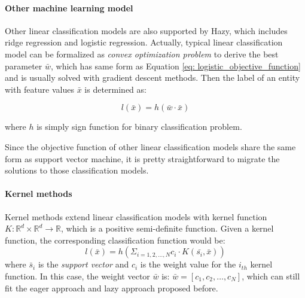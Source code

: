 \paragraph{Other machine learning model}
Other linear classification models are also supported by Hazy, which includes ridge regression and logistic regression. Actually, typical linear classification model can be formalized as {\em convex optimization problem} to derive the best parameter $\bar{w}$, which has same form as Equation \ref{eq: logistic_objective_function} and is usually solved with gradient descent methods. Then the label of an entity with feature values $\bar{x}$ is determined as:

\begin{equation}
    l(\bar{x}) = h(\bar{w}\cdot\bar{x})
\end{equation}


where $h$ is simply sign function for binary classification problem.

Since the objective function of other linear classification models share the same form as support vector machine, it is pretty straightforward to migrate the solutions to those classification models.

\paragraph{Kernel methods}
Kernel methods extend linear classification models with kernel function $K: \mathbb{R}^d \times \mathbb{R}^d \rightarrow \mathbb{R}$, which is a positive semi-definite function. Given a kernel function, the corresponding classification function would be:
\begin{equation}\label{eq: kernel classification}
    l(\bar{x})=h(\Sigma_{i=1,2,\dots,N}c_i\cdot K(\bar{s_i}, \bar{x}))
\end{equation}
where $\bar{s}_i$ is the {\em support vector} and $c_i$ is the weight value for the $i_{th}$ kernel function. In this case, the weight vector $\bar{w}$ is: $\bar{w} = [c_1, c_2,\dots, c_N]$, which can still fit the eager approach and lazy approach proposed before.

